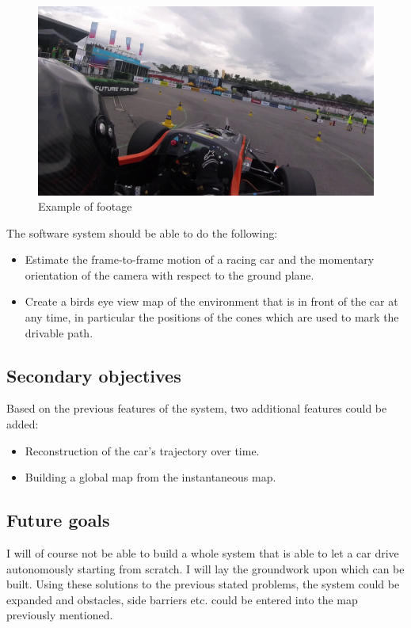 \begin{figure}
    \centering
    \includegraphics[width=1\textwidth]{figures/footage_example.jpg}
    \caption{Example of footage}
    \label{fig:footage}
\end{figure}

The software system should be able to do the following:
\begin{itemize}
    \item Estimate the frame-to-frame motion of a racing car and the momentary orientation of the camera with respect to the ground plane.
    \item Create a birds eye view map of the environment  that is in front of the car at any time, in particular the positions of the cones which are used to mark the drivable path.
\end{itemize}

\subsection{Secondary objectives}
Based on the previous features of the system, two additional features could be added: 
\begin{itemize}
    \item Reconstruction of the car's trajectory over time.
    \item Building a global map from the instantaneous map.
\end{itemize}

\subsection{Future goals}
I will of course not be able to build a whole system that is able to let a car drive autonomously starting from scratch. I will lay the groundwork upon which can be built. Using these solutions to the previous stated problems, the system could be expanded and obstacles, side barriers etc. could be entered into the map previously mentioned.


